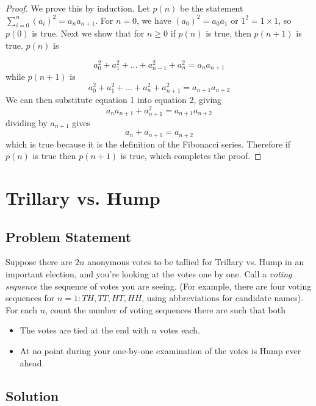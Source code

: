 \documentclass[12pt]{article}
\newcommand{\ProblemStatement}[1]{
\subsection*{Problem Statement}
#1
\subsection*{Solution}
}
\begin{document}
\begin{proof}
We prove this by induction. Let $p(n)$ be the statement $\sum_{i=0}^{n}
(a_i)^2 = a_na_{n+1}$. For $n = 0$, we have $(a_0)^2 = a_0a_1$ or $1^2 = 1 \times 1$, so $p(0)$ is true. Next we show that for $n \geq 0$ if $p(n)$ is true, then $p(n+1)$ is true. $p(n)$ is

\begin{equation}
    a_0^2 + a_1^2 + \ldots + a_{n-1}^2 + a_n^2 = a_na_{n+1}
\end{equation}
while $p(n+1)$ is 
\begin{equation}
    a_0^2 + a_1^2 + \ldots + a_n^2 + a_{n+1}^2 = a_{n+1}a_{n+2}
\end{equation}
We can then substitute equation 1 into equation 2, giving
\[
     a_na_{n+1} + a_{n+1}^2 = a_{n+1}a_{n+2}
\]
dividing by $a_{n+1}$ gives 
\[
     a_n + a_{n+1} = a_{n+2}
\]
which is true because it is the definition of the Fibonacci series. Therefore if $p(n)$ is true then $p(n+1)$ is true, which completes the proof.

\end{proof}

\begin{center}
\end{center}

\section{Trillary vs. Hump}
\ProblemStatement{
Suppose there are $2n$ anonymous votes to be tallied for Trillary vs. Hump in an important election, and you're looking at the votes one by one. Call a \emph{voting sequence} the sequence of votes you are seeing. (For example, there are four voting sequences for $n=1: TH, TT, HT, HH$, using abbreviations for candidate names). For each $n$, count the number of voting sequences there are such that both
\begin{itemize}
\item The votes are tied at the end with $n$ votes each.
\item At no point during your one-by-one examination of the votes is Hump ever ahead.
\end{itemize}
}
\end{document}
